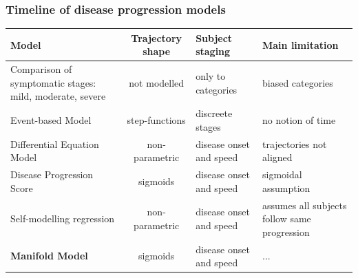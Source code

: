 \documentclass[10pt,xcolor=table]{beamer}
\begin{document}
\begin{frame}
\frametitle{Timeline of disease progression models}

\newcommand{\colWidth}{2.7}

\begin{table}
\scriptsize


\centering

\begin{tabular}{p{2.5 cm} | c | p{2 cm} | p{\colWidth cm}}

 Model & Trajectory shape & Subject staging & Main limitation \\
 \hline
 Comparison of symptomatic stages: mild, moderate, severe & \textcolor{orange0}{not modelled} & \textcolor{orange0}{only to categories} & biased categories\\
  \hline
 Event-based Model & \textcolor{orange1}{step-functions} & \textcolor{orange1}{discreete stages} & no notion of time\\
  \hline
 Differential Equation Model & \textcolor{orange3}{non-parametric} & \textcolor{orange3}{disease onset and speed} & trajectories not aligned\\
  \hline
 Disease Progression Score & \textcolor{orange2}{sigmoids} & \textcolor{orange3}{disease onset and speed} & sigmoidal assumption\\
  \hline
 Self-modelling regression & \textcolor{orange3}{non-parametric} & \textcolor{orange3}{disease onset and speed} & assumes all subjects follow same progression\\
  \hline
 \textbf{Manifold Model} & \textcolor{orange2}{sigmoids} & \textcolor{orange3}{disease onset and speed} & ...\\
\end{tabular}
\end{table}




\end{frame}
\end{document}
